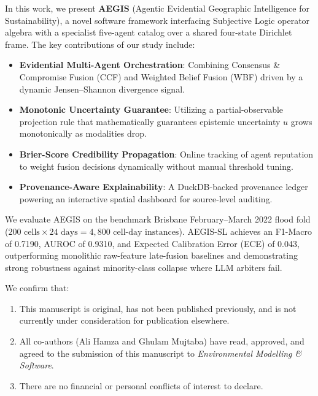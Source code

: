 \documentclass[11pt,a4paper]{article}
\begin{document}
\vspace{0.6em}

\noindent In this work, we present \textbf{AEGIS} (Agentic Evidential Geographic Intelligence for Sustainability), a novel software framework interfacing Subjective Logic operator algebra with a specialist five-agent catalog over a shared four-state Dirichlet frame. The key contributions of our study include:
\begin{itemize}
    \item \textbf{Evidential Multi-Agent Orchestration}: Combining Consensus \& Compromise Fusion (CCF) and Weighted Belief Fusion (WBF) driven by a dynamic Jensen--Shannon divergence signal.
    \item \textbf{Monotonic Uncertainty Guarantee}: Utilizing a partial-observable projection rule that mathematically guarantees epistemic uncertainty $u$ grows monotonically as modalities drop.
    \item \textbf{Brier-Score Credibility Propagation}: Online tracking of agent reputation to weight fusion decisions dynamically without manual threshold tuning.
    \item \textbf{Provenance-Aware Explainability}: A DuckDB-backed provenance ledger powering an interactive spatial dashboard for source-level auditing.
\end{itemize}

\vspace{0.6em}

\noindent We evaluate AEGIS on the benchmark Brisbane February--March 2022 flood fold ($200 \text{ cells} \times 24 \text{ days} = 4,800 \text{ cell-day instances}$). AEGIS-SL achieves an F1-Macro of 0.7190, AUROC of 0.9310, and Expected Calibration Error (ECE) of 0.043, outperforming monolithic raw-feature late-fusion baselines and demonstrating strong robustness against minority-class collapse where LLM arbiters fail.

\vspace{0.6em}

\noindent We confirm that:
\begin{enumerate}
    \item This manuscript is original, has not been published previously, and is not currently under consideration for publication elsewhere.
    \item All co-authors (Ali Hamza and Ghulam Mujtaba) have read, approved, and agreed to the submission of this manuscript to \textit{Environmental Modelling \& Software}.
    \item There are no financial or personal conflicts of interest to declare.
\end{enumerate}
\end{document}
